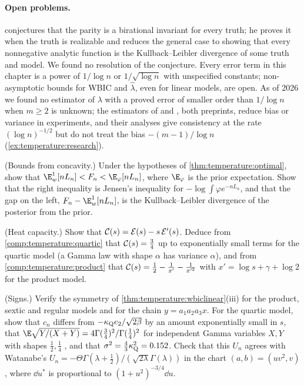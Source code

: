 \begin{refsection}
\paragraph{Open problems.} \Textcite[p.~875]{Watanabe2013} conjectures that the parity is a birational invariant for every truth; he proves it when the truth is realizable and reduces the general case to showing that every nonnegative analytic function is the Kullback--Leibler divergence of some truth and model. We found no resolution of the conjecture. Every error term in this chapter is a power of $1/\log n$ or $1/\sqrt{\log n}$ with unspecified constants; non-asymptotic bounds for WBIC and $\hat\lambda$, even for linear models, are open. As of 2026 we found no estimator of $\lambda$ with a proved error of smaller order than $1/\log n$ when $m\ge2$ is unknown; the estimators of \textcite{Imai2019a} and \textcite{TakioSuzuki2025}, both preprints, reduce bias or variance in experiments, and their analyses give consistency at the rate $(\log n)^{-1/2}$ but do not treat the bias $-(m-1)/\log n$ (\cref{ex:temperature:research}).

\begin{exercises}
\item \consolidation (Bounds from concavity.) Under the hypotheses of \cref{thm:temperature:optimal}, show that $\E^1_w[nL_n]<F_n<\E_\varphi[nL_n]$, where $\E_\varphi$ is the prior expectation. Show that the right inequality is Jensen's inequality for $-\log\int\varphi e^{-nL_n}$, and that the gap on the left, $F_n-\E^1_w[nL_n]$, is the Kullback--Leibler divergence of the posterior from the prior.\label{ex:temperature:bounds}

\item \consolidation (Heat capacity.) Show that $\mathcal{C}(s)=\mathcal{E}(s)-s\,\mathcal{E}'(s)$. Deduce from \cref{comp:temperature:quartic} that $\mathcal{C}(s)=\frac34$ up to exponentially small terms for the quartic model (a Gamma law with shape $\alpha$ has variance $\alpha$), and from \cref{comp:temperature:product} that $\mathcal{C}(s)=\frac12-\frac1{x'}-\frac1{x'^2}$ with $x'=\log s+\gamma+\log2$ for the product model.\label{ex:temperature:heat}

\item \consolidation (Signs.) Verify the symmetry of \cref{thm:temperature:wbiclinear}(iii) for the product, sextic and regular models and for the chain $y=a_1a_2a_3x$. For the quartic model, show that $c_n$ differs from $-\kappa_{\mathrm{Q}} e_2/\sqrt{2\beta}$ by an amount exponentially small in $s$, that $\E\sqrt{Y/(X+Y)}=4\Gamma(\frac34)^2/\Gamma(\frac14)^2$ for independent Gamma variables $X,Y$ with shapes $\frac12,\frac14$ , and that $\sigma^2=\frac43\kappa_{\mathrm{Q}}^2=0.152$. Check that this $U_n$ agrees with Watanabe's $U_n=-\Theta\Gamma(\lambda+\frac12)/(\sqrt{2\lambda}\Gamma(\lambda))$ in the chart $(a,b)=(uv^2,v)$, where $\dd u^*$ is proportional to $(1+u^2)^{-3/4}\dd u$.\label{ex:temperature:bound}


\end{exercises}
\end{refsection}
